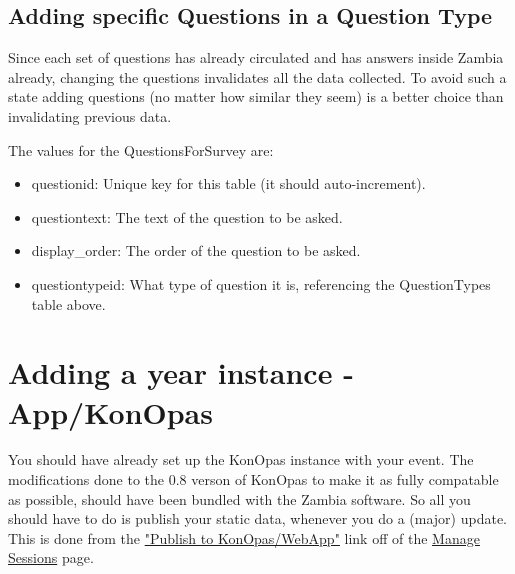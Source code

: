 \documentclass[captions=tablesignature]{scrartcl}
\begin{document}
\subsection{Adding specific Questions in a Question Type}
\label{sec-15-5}

Since each set of questions has already circulated and has answers
inside Zambia already, changing the questions invalidates all the
data collected. To avoid such a state adding questions (no matter
how similar they seem) is a better choice than invalidating
previous data.

The values for the QuestionsForSurvey are:
\begin{itemize}
\item questionid: Unique key for this table (it should auto-increment).
\item questiontext: The text of the question to be asked.
\item display\_order: The order of the question to be asked.
\item questiontypeid: What type of question it is, referencing the
QuestionTypes table above.
\end{itemize}

\section{Adding a year instance - App/KonOpas}
\label{sec-16}

You should have already set up the KonOpas instance with your
event.  The modifications done to the 0.8 verson of KonOpas to make
it as fully compatable as possible, should have been bundled with
the Zambia software.  So all you should have to do is publish your
static data, whenever you do a (major) update.  This is done from
the \href{../webpages/KonOpasData.php}{"Publish to KonOpas/WebApp"} link off of the \href{../webpages/StaffManageSessions.php}{Manage Sessions} page.
\end{document}
